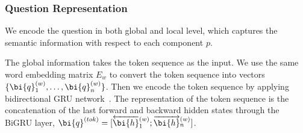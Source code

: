 \subsubsection{Question Representation}
\label{sec:qw-repr}



We encode the question in both global and local level,
which captures the semantic information with respect to each component $p$.

The global information takes the token sequence as the input.
We use the same word embedding matrix $E_w$ to convert the token sequence into vectors
$\{\bi{q}_1^{(w)}, \dots, \bi{q}_n^{(w)}\}$.
Then we encode the token sequence by applying bidirectional GRU network~\cite{cho2014properties}.
The representation of the token sequence is the concatenation
of the last forward and backward hidden states through the BiGRU layer,
$\bi{q}^{(tok)} = [\overleftarrow{\bi{h}}_1^{(w)};\overrightarrow{\bi{h}}_n^{(w)}]$.


